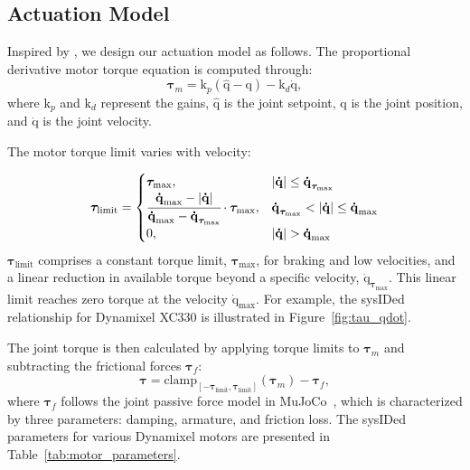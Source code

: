 \subsection{Actuation Model}
\label{sec:actuation_model}

Inspired by \citet{grandia2024design}, we design our actuation model as follows. 
The proportional derivative motor torque equation is computed through:
\begin{equation}
\bm{\tau}_m = \bm{{\mathrm{k}}}_p (\bm{{\hat{\mathrm{q}}}}-\bm{\mathrm{q}}) - \bm{{\mathrm{k}}}_d \bm{\dot{\mathrm{q}}},
\end{equation}
where $\bm{{\mathrm{k}}}_p$ and $\bm{{\mathrm{k}}}_d$ represent the gains, $\bm{\hat{\mathrm{q}}}$ is the joint setpoint, $\bm{{\mathrm{q}}}$ is the joint position, and $\bm{\dot{\mathrm{q}}}$ is the joint velocity.

The motor torque limit varies with velocity: 

\begin{equation}
\bm{\tau}_{\text{limit}} = 
\begin{cases} 
\bm{\tau}_{\max}, & |\bm{\dot{\mathrm{q}}}| \leq \bm{\dot{\mathrm{q}}}_{\bm{\tau}_{\max}} \\
\cfrac{\bm{\dot{\mathrm{q}}}_{\max} - |\bm{\dot{\mathrm{q}}}|}{\bm{\dot{\mathrm{q}}}_{\max} - \bm{\dot{\mathrm{q}}}_{\bm{\tau}_{\max}}} \cdot \bm{\tau}_{\max}, & \bm{\dot{\mathrm{q}}}_{\bm{\tau}_{\max}} < |\bm{\dot{\mathrm{q}}}| \leq \bm{\dot{\mathrm{q}}}_{\max} \\
0, & |\bm{\dot{\mathrm{q}}}| > \bm{\dot{\mathrm{q}}}_{\max}
\end{cases}
\end{equation}
$\bm{\tau}_{\text{limit}}$ comprises a constant torque limit, $\bm{\tau}_{\max}$, for braking and low velocities, and a linear reduction in available torque beyond a specific velocity, $\bm{\dot{\mathrm{q}}}_{\bm{\tau}_{\max}}$. This linear limit reaches zero torque at the velocity $\bm{\dot{\mathrm{q}}}_{\max}$. For example, the sysIDed relationship for Dynamixel XC330 is illustrated in Figure~\ref{fig:tau_qdot}. 


The joint torque is then calculated by applying torque limits to $\bm{\tau}_m$ and subtracting the frictional forces $\bm{\tau}_f$:
\begin{equation}
    \bm{\tau} = \text{clamp}_{[-\bm{\tau}_{\text{limit}}, \bm{\tau}_{\text{limit}}]}(\bm{\tau}_m) - \bm{\tau}_f,
\end{equation}
where $\bm{\tau}_f$ follows the joint passive force model in MuJoCo~\citep{todorov2012mujoco}, which is characterized by three parameters: damping, armature, and friction loss.
The sysIDed parameters for various Dynamixel motors are presented in Table~\ref{tab:motor_parameters}.

